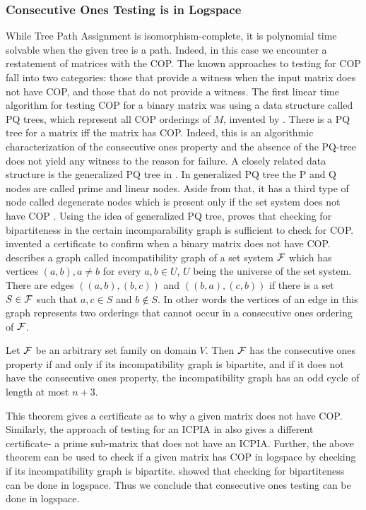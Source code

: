 \documentclass[MS]             %
              {iitmdiss_as}    %
\begin{document}
\subsubsection{Consecutive Ones Testing is in Logspace}
While Tree Path Assignment is isomorphism-complete, it is polynomial
time solvable when the given tree is a path.  Indeed, in this case we
encounter a restatement of matrices with the COP.  The known
approaches to testing for COP fall into two categories: those that
provide a witness when the input matrix does not have COP, and those
that do not provide a witness.  The first linear time algorithm for
testing COP for a binary matrix was using a data structure called PQ
trees, which represent all COP orderings of $M$, invented by
\cite{bl76}. There is a PQ tree for a matrix iff the matrix has COP.
Indeed, this is an algorithmic characterization of the consecutive
ones property and the absence of the PQ-tree does not yield any
witness to the reason for failure.  A closely related data structure
is the generalized PQ tree in \cite{mcc04}.  In generalized PQ tree
the P and Q nodes are called prime and linear nodes. Aside from that,
it has a third type of node called degenerate nodes which is present
only if the set system does not have COP \cite{mcc04}.  Using the idea
of generalized PQ tree, \cite{mcc04} proves that checking for
bipartiteness in the certain incomparability graph is sufficient to
check for COP.  \cite{mcc04} invented a certificate to confirm when a
binary matrix does not have COP.  \cite{mcc04} describes a graph
called incompatibility graph of a set system ${\cal F}$ which has vertices
$(a,b), a \ne b$ for every $a, b \in U$, $U$ being the universe of the
set system. There are edges $((a,b),(b,c))$ and $((b,a),(c,b))$ if
there is a set $S \in {\cal F}$ such that $a, c \in S$ and $b \notin S$. In
other words the vertices of an edge in this graph represents two
orderings that cannot occur in a consecutive ones ordering of ${\cal F}$.
\begin{theorem}
  Let ${\cal F}$ be an arbitrary set family on domain $V$. Then ${\cal F}$ has
  the consecutive ones property if and only if its incompatibility
  graph is bipartite, and if it does not have the consecutive ones
  property, the incompatibility graph has an odd cycle of length at
  most $n+3$.
\end{theorem}
This theorem gives a certificate as to why a given matrix does not
have COP.  Similarly, the approach of testing for an ICPIA in
\cite{nsnrs09} also gives a different certificate- a prime sub-matrix
that does not have an ICPIA.  Further, the above theorem can be used
to check if a given matrix has COP in logspace by checking if its
incompatibility graph is bipartite. \cite{rei84} showed that checking
for bipartiteness can be done in logspace. Thus we conclude that
consecutive ones testing can be done in logspace.
\end{document}
